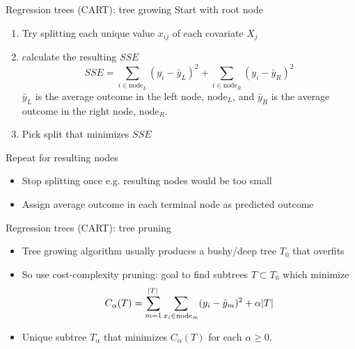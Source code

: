 \documentclass[handout]{beamer}
\begin{document}
\begin{frame}{Regression trees (CART): tree growing}
  Start with root node
  
  \begin{enumerate}[<+(1)->]
  \item Try splitting each unique value $x_{ij}$ of each covariate $X_{j}$
  \item calculate the resulting $SSE$
  \begin{equation*}
    SSE = \sum_{i \in \text{node}_{L}} (y_{i} - \bar{y}_{L})^2 + \sum_{i \in \text{node}_{R}} (y_{i} - \bar{y}_{R})^2
  \end{equation*}
  $\bar{y}_{L}$ is the average outcome in the left node, $\text{node}_{L}$, and $\bar{y}_{R}$ is the average outcome in the right node, $\text{node}_{R}$.
  \item Pick split that minimizes $SSE$
    \end{enumerate}
  \pause
  Repeat for resulting nodes 
    
  \begin{itemize}[<+(1)->]
  \item Stop splitting once e.g. resulting nodes would be too small
  \item Assign average outcome in each terminal node as predicted outcome 
  \end{itemize}
\end{frame}

\begin{frame}[c]{Regression trees (CART): tree pruning}
  \begin{itemize}[<+->]
    \item Tree growing algorithm usually produces a bushy/deep tree $T_{0}$ that overfits
    \item So use cost-complexity pruning: goal to find subtrees $T \subset T_{0}$ which minimize
    \begin{equation*}
        C_{\alpha}(T) = \sum_{m = 1}^{\abs{T}} \sum_{x_{i} \in \text{node}_{m}} (y_{i} - \bar{y}_{m})^2 + \alpha \abs{T}
    \end{equation*}
    \item Unique subtree $T_{\alpha}$ that minimizes $C_{\alpha}(T)$ for each $\alpha \geq 0$.
  \end{itemize}
\end{frame}
\end{document}
